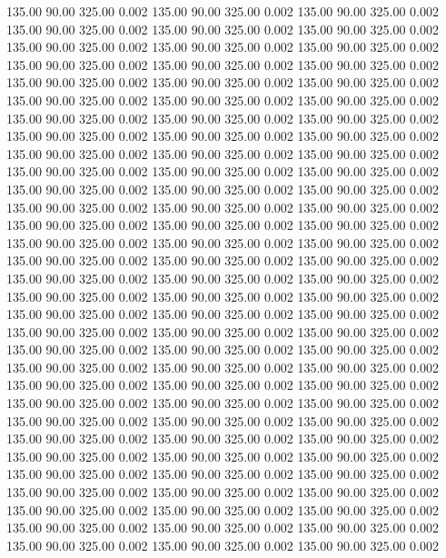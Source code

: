 135.00  90.00  325.00 0.002
135.00  90.00  325.00 0.002
135.00  90.00  325.00 0.002
135.00  90.00  325.00 0.002
135.00  90.00  325.00 0.002
135.00  90.00  325.00 0.002
135.00  90.00  325.00 0.002
135.00  90.00  325.00 0.002
135.00  90.00  325.00 0.002
135.00  90.00  325.00 0.002
135.00  90.00  325.00 0.002
135.00  90.00  325.00 0.002
135.00  90.00  325.00 0.002
135.00  90.00  325.00 0.002
135.00  90.00  325.00 0.002
135.00  90.00  325.00 0.002
135.00  90.00  325.00 0.002
135.00  90.00  325.00 0.002
135.00  90.00  325.00 0.002
135.00  90.00  325.00 0.002
135.00  90.00  325.00 0.002
135.00  90.00  325.00 0.002
135.00  90.00  325.00 0.002
135.00  90.00  325.00 0.002
135.00  90.00  325.00 0.002
135.00  90.00  325.00 0.002
135.00  90.00  325.00 0.002
135.00  90.00  325.00 0.002
135.00  90.00  325.00 0.002
135.00  90.00  325.00 0.002
135.00  90.00  325.00 0.002
135.00  90.00  325.00 0.002
135.00  90.00  325.00 0.002
135.00  90.00  325.00 0.002
135.00  90.00  325.00 0.002
135.00  90.00  325.00 0.002
135.00  90.00  325.00 0.002
135.00  90.00  325.00 0.002
135.00  90.00  325.00 0.002
135.00  90.00  325.00 0.002
135.00  90.00  325.00 0.002
135.00  90.00  325.00 0.002
135.00  90.00  325.00 0.002
135.00  90.00  325.00 0.002
135.00  90.00  325.00 0.002
135.00  90.00  325.00 0.002
135.00  90.00  325.00 0.002
135.00  90.00  325.00 0.002
135.00  90.00  325.00 0.002
135.00  90.00  325.00 0.002
135.00  90.00  325.00 0.002
135.00  90.00  325.00 0.002
135.00  90.00  325.00 0.002
135.00  90.00  325.00 0.002
135.00  90.00  325.00 0.002
135.00  90.00  325.00 0.002
135.00  90.00  325.00 0.002
135.00  90.00  325.00 0.002
135.00  90.00  325.00 0.002
135.00  90.00  325.00 0.002
135.00  90.00  325.00 0.002
135.00  90.00  325.00 0.002
135.00  90.00  325.00 0.002
135.00  90.00  325.00 0.002
135.00  90.00  325.00 0.002
135.00  90.00  325.00 0.002
135.00  90.00  325.00 0.002
135.00  90.00  325.00 0.002
135.00  90.00  325.00 0.002
135.00  90.00  325.00 0.002
135.00  90.00  325.00 0.002
135.00  90.00  325.00 0.002
135.00  90.00  325.00 0.002
135.00  90.00  325.00 0.002
135.00  90.00  325.00 0.002
135.00  90.00  325.00 0.002
135.00  90.00  325.00 0.002
135.00  90.00  325.00 0.002
135.00  90.00  325.00 0.002
135.00  90.00  325.00 0.002
135.00  90.00  325.00 0.002
135.00  90.00  325.00 0.002
135.00  90.00  325.00 0.002
135.00  90.00  325.00 0.002
135.00  90.00  325.00 0.002
135.00  90.00  325.00 0.002
135.00  90.00  325.00 0.002
135.00  90.00  325.00 0.002
135.00  90.00  325.00 0.002
135.00  90.00  325.00 0.002
135.00  90.00  325.00 0.002
135.00  90.00  325.00 0.002
135.00  90.00  325.00 0.002
